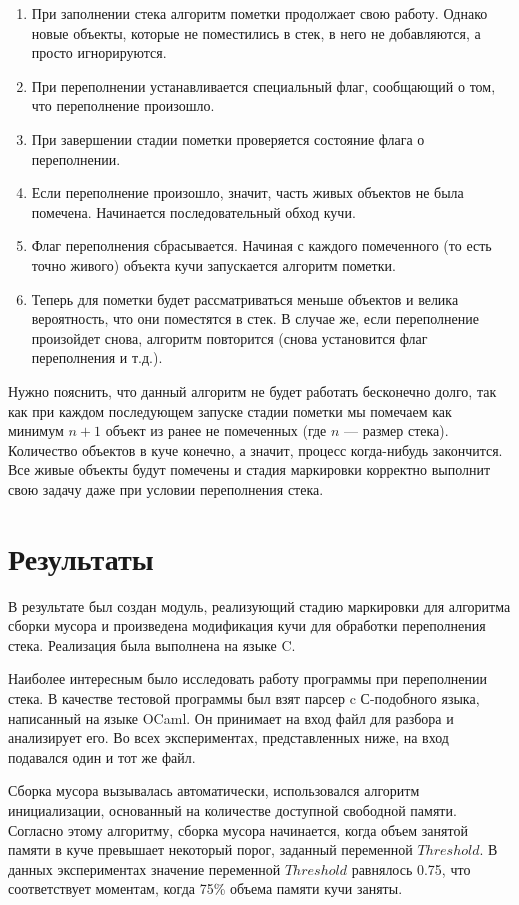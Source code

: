 \begin{enumerate}
   \item При заполнении стека алгоритм пометки продолжает свою работу. Однако новые объекты, которые не поместились в стек, в него не добавляются,
   а просто игнорируются.
   \item При переполнении устанавливается специальный флаг, сообщающий о том, что переполнение произошло.
   \item При завершении стадии пометки проверяется состояние флага о переполнении.
   \item Если переполнение произошло, значит, часть живых объектов не была помечена. Начинается последовательный обход кучи.
   \item Флаг переполнения сбрасывается. Начиная с каждого помеченного (то есть точно живого) объекта кучи запускается алгоритм пометки.
   \item Теперь для пометки будет рассматриваться меньше объектов и велика вероятность, что они поместятся в стек. В случае же, если переполнение 
   произойдет снова, алгоритм повторится (снова установится флаг переполнения и т.д.).
\end{enumerate}

Нужно пояснить, что данный алгоритм не будет работать бесконечно долго, так как при каждом последующем запуске стадии пометки мы помечаем 
как минимум $n + 1$ объект из ранее не помеченных (где $n$ --- размер стека). Количество объектов в куче конечно, а значит, процесс когда-нибудь 
закончится. Все живые объекты будут помечены и стадия маркировки корректно выполнит свою задачу даже при условии переполнения стека.

\section{Результаты}
В результате был создан модуль, реализующий стадию маркировки для алгоритма сборки мусора и произведена модификация кучи для обработки переполнения стека.
Реализация была выполнена на языке C. 

Наиболее интересным было исследовать работу программы при переполнении стека. В качестве тестовой программы был взят парсер c С-подобного языка,
написанный на языке OCaml. Он принимает на вход файл для разбора и анализирует его. Во всех экспериментах, представленных ниже, на вход подавался
один и тот же файл. 

Сборка мусора вызывалась автоматически, использовался алгоритм инициализации, основанный на количестве доступной свободной памяти. Согласно 
этому алгоритму, сборка мусора начинается, когда объем занятой памяти в куче превышает некоторый порог, заданный переменной $Threshold$. В данных 
экспериментах значение переменной $Threshold$ равнялось 0.75, что соответствует моментам, когда 75\% объема памяти кучи заняты.  

